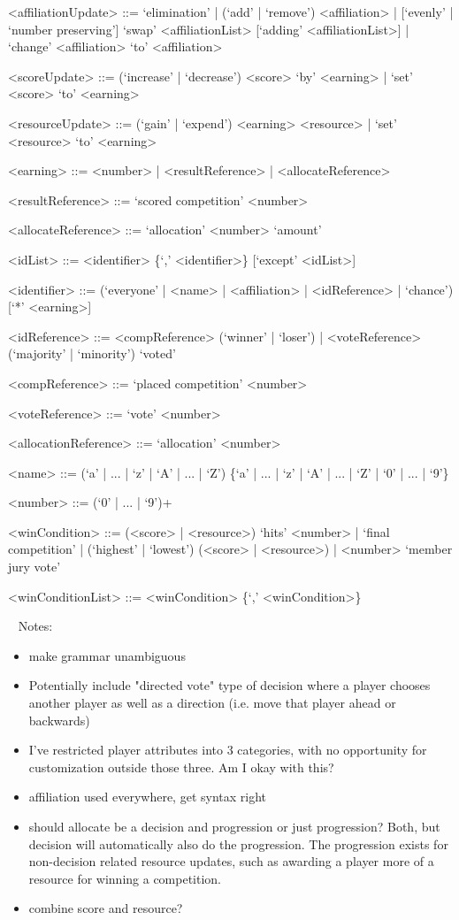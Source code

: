 \documentclass{article}
\begin{document}
\begin{grammar}
<affiliationUpdate> ::= `elimination' | (`add' | `remove') <affiliation> | 
[`evenly' | `number preserving'] `swap' <affiliationList> [`adding' 
<affiliationList>] | `change' <affiliation> `to' <affiliation>

<scoreUpdate> ::= (`increase' | `decrease') <score> `by' <earning> | `set' 
<score> `to' <earning> 

<resourceUpdate> ::= (`gain' | `expend') <earning> <resource> | `set' 
<resource> `to' <earning> 

<earning> ::= <number> | <resultReference> | <allocateReference>

<resultReference> ::= `scored competition' <number> 

<allocateReference> ::= `allocation' <number> `amount'

<idList> ::= <identifier> \{`,' <identifier>\} [`except' <idList>]

<identifier> ::= (`everyone' | <name> | <affiliation> | <idReference> | 
`chance') [`*' <earning>]

<idReference> ::= <compReference> (`winner' | `loser') | <voteReference> 
(`majority' | `minority') `voted' 

<compReference> ::= `placed competition' <number>

<voteReference> ::= `vote' <number>

<allocationReference> ::= `allocation' <number>

<name> ::= (`a' | ... | `z' | `A' | ... | `Z') \{`a' | ... | `z' | `A' | ... | 
`Z' | `0' | ... | `9'\}

<number> ::= (`0' | ... | `9')+

<winCondition> ::= (<score> | <resource>) `hits' <number> | `final competition' 
| (`highest' | `lowest') (<score> | <resource>) | <number> `member jury vote'

<winConditionList> ::= <winCondition> \{`,' <winCondition>\}

\end{grammar}

~\newline
Notes:
\begin{itemize}
	\item make grammar unambiguous
	\item Potentially include "directed vote" type of decision where a player 
	chooses another player as well as a direction (i.e. move that player ahead 
	or backwards)
	\item I've restricted player attributes into 3 categories, with no 
	opportunity for customization outside those three. Am I okay with this?
	\item affiliation used everywhere, get syntax right
	\item should allocate be a decision and progression or just progression? 
	Both, but decision will automatically also do the progression. The 
	progression exists for non-decision related resource updates, such as 
	awarding a player more of a resource for winning a competition.
	\item combine score and resource?
\end{itemize}
\end{document}
